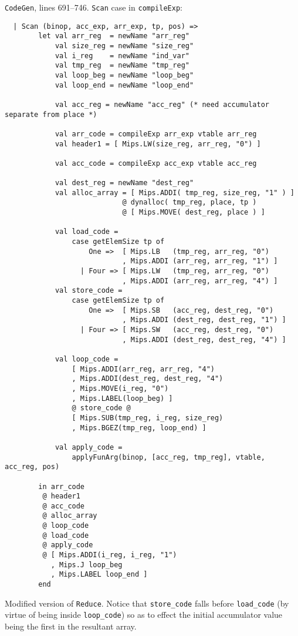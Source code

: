 \documentclass[12pt, a4paper]{article}
\begin{document}
\texttt{CodeGen}, lines 691--746. \texttt{Scan} case in \texttt{compileExp}:
\begin{lstlisting}
  | Scan (binop, acc_exp, arr_exp, tp, pos) =>
        let val arr_reg  = newName "arr_reg"   
            val size_reg = newName "size_reg"  
            val i_reg    = newName "ind_var"   
            val tmp_reg  = newName "tmp_reg"   
            val loop_beg = newName "loop_beg"
            val loop_end = newName "loop_end"

            val acc_reg = newName "acc_reg" (* need accumulator separate from place *)

            val arr_code = compileExp arr_exp vtable arr_reg
            val header1 = [ Mips.LW(size_reg, arr_reg, "0") ]

            val acc_code = compileExp acc_exp vtable acc_reg

            val dest_reg = newName "dest_reg"
            val alloc_array = [ Mips.ADDI( tmp_reg, size_reg, "1" ) ]
                            @ dynalloc( tmp_reg, place, tp )
                            @ [ Mips.MOVE( dest_reg, place ) ]

            val load_code =
                case getElemSize tp of
                    One =>  [ Mips.LB   (tmp_reg, arr_reg, "0")
                            , Mips.ADDI (arr_reg, arr_reg, "1") ]
                  | Four => [ Mips.LW   (tmp_reg, arr_reg, "0")
                            , Mips.ADDI (arr_reg, arr_reg, "4") ]
            val store_code =
                case getElemSize tp of
                    One =>  [ Mips.SB   (acc_reg, dest_reg, "0")
                            , Mips.ADDI (dest_reg, dest_reg, "1") ]
                  | Four => [ Mips.SW   (acc_reg, dest_reg, "0")
                            , Mips.ADDI (dest_reg, dest_reg, "4") ]

            val loop_code =
                [ Mips.ADDI(arr_reg, arr_reg, "4")
                , Mips.ADDI(dest_reg, dest_reg, "4")
                , Mips.MOVE(i_reg, "0")
                , Mips.LABEL(loop_beg) ]
                @ store_code @
                [ Mips.SUB(tmp_reg, i_reg, size_reg)
                , Mips.BGEZ(tmp_reg, loop_end) ]

            val apply_code =
                applyFunArg(binop, [acc_reg, tmp_reg], vtable, acc_reg, pos)

        in arr_code
         @ header1
         @ acc_code
         @ alloc_array
         @ loop_code
         @ load_code
         @ apply_code
         @ [ Mips.ADDI(i_reg, i_reg, "1")
           , Mips.J loop_beg
           , Mips.LABEL loop_end ]
        end
\end{lstlisting}
Modified version of \texttt{Reduce}. Notice that \verb+store_code+ falls before
\verb+load_code+ (by virtue of being inside \verb+loop_code+) so as to effect the
initial accumulator value being the first in the resultant array.
\end{document}
